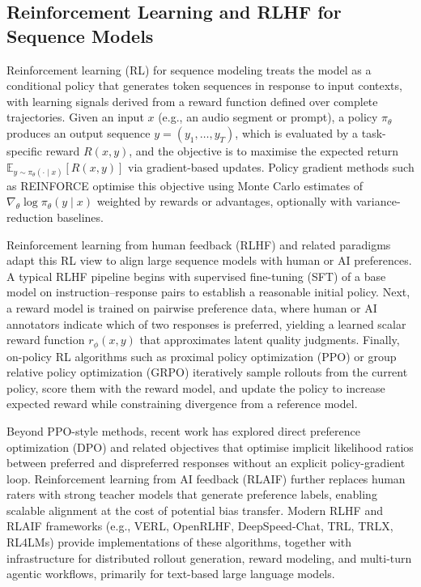 \documentclass[conference]{IEEEtran}
\begin{document}
\subsection{Reinforcement Learning and RLHF for Sequence Models}

Reinforcement learning (RL) for sequence modeling treats the model as a conditional policy that generates token sequences in response to input contexts, with learning signals derived from a reward function defined over complete trajectories. Given an input $x$ (e.g., an audio segment or prompt), a policy $\pi_\theta$ produces an output sequence $y = (y_1, \dots, y_T)$, which is evaluated by a task-specific reward $R(x, y)$, and the objective is to maximise the expected return $\mathbb{E}_{y \sim \pi_\theta(\cdot \mid x)}[R(x, y)]$ via gradient-based updates. Policy gradient methods such as REINFORCE optimise this objective using Monte Carlo estimates of $\nabla_\theta \log \pi_\theta(y \mid x)$ weighted by rewards or advantages, optionally with variance-reduction baselines.

Reinforcement learning from human feedback (RLHF) and related paradigms adapt this RL view to align large sequence models with human or AI preferences. A typical RLHF pipeline begins with supervised fine-tuning (SFT) of a base model on instruction–response pairs to establish a reasonable initial policy. Next, a reward model is trained on pairwise preference data, where human or AI annotators indicate which of two responses is preferred, yielding a learned scalar reward function $r_\phi(x, y)$ that approximates latent quality judgments. Finally, on-policy RL algorithms such as proximal policy optimization (PPO) or group relative policy optimization (GRPO) iteratively sample rollouts from the current policy, score them with the reward model, and update the policy to increase expected reward while constraining divergence from a reference model.

Beyond PPO-style methods, recent work has explored direct preference optimization (DPO) and related objectives that optimise implicit likelihood ratios between preferred and dispreferred responses without an explicit policy-gradient loop. Reinforcement learning from AI feedback (RLAIF) further replaces human raters with strong teacher models that generate preference labels, enabling scalable alignment at the cost of potential bias transfer. Modern RLHF and RLAIF frameworks (e.g., VERL, OpenRLHF, DeepSpeed-Chat, TRL, TRLX, RL4LMs) provide implementations of these algorithms, together with infrastructure for distributed rollout generation, reward modeling, and multi-turn agentic workflows, primarily for text-based large language models.
\end{document}
